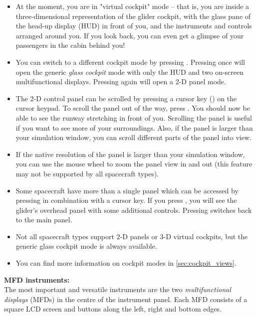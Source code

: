 \documentclass[Orbiter User Manual.tex]{subfiles}
\begin{document}
\begin{itemize}
\item At the moment, you are in "virtual cockpit" mode – that is, you are inside a three-dimensional representation of the glider cockpit, with the glass pane of the head-up display (HUD) in front of you, and the instruments and controls arranged around you. If you look back, you can even get a glimpse of your passengers in the cabin behind you!
\item You can switch to a different cockpit mode by pressing . Pressing  once will open the generic \textit{glass cockpit} mode with only the HUD and two on-screen multifunctional displays. Pressing  again will open a 2-D panel mode.
\item The 2-D control panel can be scrolled by pressing a cursor key (\DArrow\UArrow\RArrow\LArrow) on the cursor keypad. To scroll the panel out of the way, press \UArrow. You should now be able to see the runway stretching in front of you. Scrolling the panel is useful if you want to see more of your surroundings. Also, if the panel is larger than your simulation window, you can scroll different parts of the panel into view.
\item If the native resolution of the panel is larger than your simulation window, you can use the mouse wheel to zoom the panel view in and out (this feature may not be supported by all spacecraft types).
\item Some spacecraft have more than a single panel which can be accessed by pressing \Ctrl in combination with a cursor key. If you press \Ctrl\UArrow, you will see the glider's overhead panel with some additional controls. Pressing \Ctrl\DArrow switches back to the main panel.
\item Not all spacecraft types support 2-D panels or 3-D virtual cockpits, but the generic glass cockpit mode is always available.
\item You can find more information on cockpit modes in \ref{sec:cockpit_views}.
\end{itemize}

\noindent
\textbf{MFD instruments:}\\
The most important and versatile instruments are the two \textit{multifunctional displays} (MFDs) in the centre of the instrument panel. Each MFD consists of a square LCD screen and buttons along the left, right and bottom edges.
\end{document}
